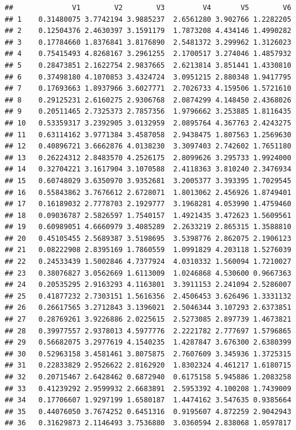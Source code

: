 \documentclass[
  11pt,
]{book}
\begin{document}
\begin{verbatim}
##              V1        V2        V3         V4       V5        V6
## 1    0.31480075 3.7742194 3.9885237  2.6561280 3.902766 1.2282205
## 2    0.12504376 2.4630397 3.1591179  1.7873208 4.434146 1.4990282
## 3    0.17784660 1.8376841 3.8176890  2.5481372 3.299962 1.3126023
## 4    0.75415493 4.8268167 3.2961255  2.1700517 3.274046 1.4857932
## 5    0.28473851 2.1622754 2.9837665  2.6213814 3.851441 1.4330810
## 6    0.37498180 4.1070853 3.4324724  3.0951215 2.880348 1.9417795
## 7    0.17693663 1.8937966 3.6027771  2.7026733 4.159506 1.5721610
## 8    0.29125231 2.6160275 2.9306768  2.0874299 4.148450 2.4368026
## 9    0.20511465 2.7325373 2.7857356  1.9796662 3.253885 1.8116435
## 10   0.53359317 3.2392905 3.0132959  2.0895764 4.367763 2.4243275
## 11   0.63114162 3.9771384 3.4587058  2.9438475 1.807563 1.2569630
## 12   0.40896721 3.6662876 4.0138230  3.3097403 2.742602 1.7651180
## 13   0.26224312 2.8483570 4.2526175  2.8099626 3.295733 1.9924000
## 14   0.32704221 3.1617904 3.1070588  2.4118363 3.810240 2.3476934
## 15   0.60748029 3.6350970 3.9352681  3.2005377 3.393395 1.7029545
## 16   0.55843862 3.7676612 2.6728071  1.8013062 2.456926 1.8749401
## 17   0.16189032 2.7778703 2.1929777  3.1968281 4.053990 1.4759460
## 18   0.09036787 2.5826597 1.7540157  1.4921435 3.472623 1.5609561
## 19   0.60989051 4.6660979 3.4085289  2.2633219 2.865315 1.3588810
## 20   0.45105455 2.5689387 3.5198695  3.5398776 2.862075 2.1906123
## 21   0.08222908 2.8395169 1.7860559  1.0991829 4.203118 1.5276039
## 22   0.24533439 1.5002846 4.7377924  4.0310332 1.560094 1.7210027
## 23   0.38076827 3.0562669 1.6113009  1.0246868 4.530600 0.9667363
## 24   0.20535295 2.9163293 4.1163801  3.3911153 2.241094 2.5286007
## 25   0.41877232 2.7303151 1.5616356  2.4506453 3.626496 1.3331132
## 26   0.26617565 3.2712843 3.1396021  2.5046344 3.107293 2.6373851
## 27   0.28769261 3.9226886 2.0225615  2.5273085 2.897739 1.4673821
## 28   0.39977557 2.9378013 4.5977776  2.2221782 2.777697 1.5796865
## 29   0.56682075 3.2977619 4.1540235  1.4287847 3.676300 2.6380399
## 30   0.52963158 3.4581461 3.8075875  2.7607609 3.345936 1.3725315
## 31   0.22833829 2.9526622 2.8162920  1.8302324 4.461217 1.6180715
## 32   0.20715467 2.6428462 0.6872940  0.6175158 5.945886 1.2083258
## 33   0.41239292 2.9599932 2.6683891  2.5953392 4.100208 1.7439009
## 34   0.17706607 1.9297199 1.6580187  1.4474162 3.547635 0.9385664
## 35   0.44076050 3.7674252 0.6451316  0.9195607 4.872259 2.9042943
## 36   0.31629873 2.1146493 3.7536880  3.0360594 2.838068 1.0597817

\end{verbatim}
\end{document}
